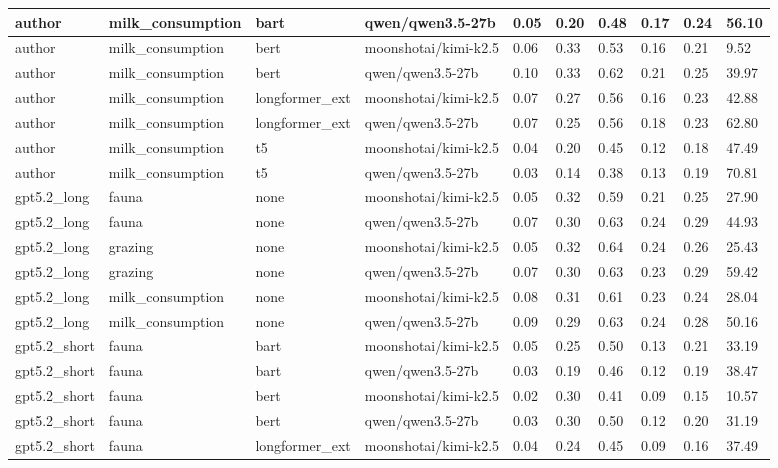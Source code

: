 \begin{tabular}{|l|l|l|l|l|l|l|l|l|l|}
 \hline
 author & milk\_consumption & bart & qwen/qwen3.5-27b & 0.05 & 0.20 & 0.48 & 0.17 & 0.24 & 56.10 \\
 \hline
 author & milk\_consumption & bert & moonshotai/kimi-k2.5 & 0.06 & 0.33 & 0.53 & 0.16 & 0.21 & 9.52 \\
 \hline
 author & milk\_consumption & bert & qwen/qwen3.5-27b & 0.10 & 0.33 & 0.62 & 0.21 & 0.25 & 39.97 \\
 \hline
 author & milk\_consumption & longformer\_ext & moonshotai/kimi-k2.5 & 0.07 & 0.27 & 0.56 & 0.16 & 0.23 & 42.88 \\
 \hline
 author & milk\_consumption & longformer\_ext & qwen/qwen3.5-27b & 0.07 & 0.25 & 0.56 & 0.18 & 0.23 & 62.80 \\
 \hline
 author & milk\_consumption & t5 & moonshotai/kimi-k2.5 & 0.04 & 0.20 & 0.45 & 0.12 & 0.18 & 47.49 \\
 \hline
 author & milk\_consumption & t5 & qwen/qwen3.5-27b & 0.03 & 0.14 & 0.38 & 0.13 & 0.19 & 70.81 \\
 \hline
 gpt5.2\_long & fauna & none & moonshotai/kimi-k2.5 & 0.05 & 0.32 & 0.59 & 0.21 & 0.25 & 27.90 \\
 \hline
 gpt5.2\_long & fauna & none & qwen/qwen3.5-27b & 0.07 & 0.30 & 0.63 & 0.24 & 0.29 & 44.93 \\
 \hline
 gpt5.2\_long & grazing & none & moonshotai/kimi-k2.5 & 0.05 & 0.32 & 0.64 & 0.24 & 0.26 & 25.43 \\
 \hline
 gpt5.2\_long & grazing & none & qwen/qwen3.5-27b & 0.07 & 0.30 & 0.63 & 0.23 & 0.29 & 59.42 \\
 \hline
 gpt5.2\_long & milk\_consumption & none & moonshotai/kimi-k2.5 & 0.08 & 0.31 & 0.61 & 0.23 & 0.24 & 28.04 \\
 \hline
 gpt5.2\_long & milk\_consumption & none & qwen/qwen3.5-27b & 0.09 & 0.29 & 0.63 & 0.24 & 0.28 & 50.16 \\
 \hline
 gpt5.2\_short & fauna & bart & moonshotai/kimi-k2.5 & 0.05 & 0.25 & 0.50 & 0.13 & 0.21 & 33.19 \\
 \hline
 gpt5.2\_short & fauna & bart & qwen/qwen3.5-27b & 0.03 & 0.19 & 0.46 & 0.12 & 0.19 & 38.47 \\
 \hline
 gpt5.2\_short & fauna & bert & moonshotai/kimi-k2.5 & 0.02 & 0.30 & 0.41 & 0.09 & 0.15 & 10.57 \\
 \hline
 gpt5.2\_short & fauna & bert & qwen/qwen3.5-27b & 0.03 & 0.30 & 0.50 & 0.12 & 0.20 & 31.19 \\
 \hline
 gpt5.2\_short & fauna & longformer\_ext & moonshotai/kimi-k2.5 & 0.04 & 0.24 & 0.45 & 0.09 & 0.16 & 37.49 \\

\end{tabular}
